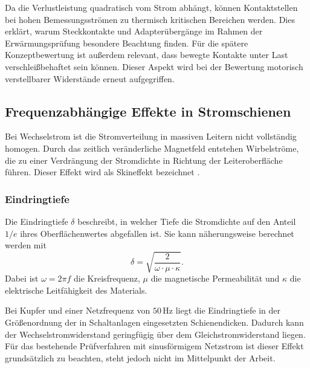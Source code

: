 Da die Verlustleistung quadratisch vom Strom abhängt, können Kontaktstellen bei hohen Bemessungsströmen zu thermisch kritischen Bereichen werden. Dies erklärt, warum Steckkontakte und Adapterübergänge im Rahmen der Erwärmungsprüfung besondere Beachtung finden. Für die spätere Konzeptbewertung ist außerdem relevant, dass bewegte Kontakte unter Last verschleißbehaftet sein können. Dieser Aspekt wird bei der Bewertung motorisch verstellbarer Widerstände erneut aufgegriffen.

\subsection{Frequenzabhängige Effekte in Stromschienen}
\label{sec:frequenzabhaengige_effekte}

Bei Wechselstrom ist die Stromverteilung in massiven Leitern nicht vollständig homogen. Durch das zeitlich veränderliche Magnetfeld entstehen Wirbelströme, die zu einer Verdrängung der Stromdichte in Richtung der Leiteroberfläche führen. Dieser Effekt wird als Skineffekt bezeichnet \cite{Kuepfmueller_TET}.

\subsubsection{Eindringtiefe}
\label{sec:eindringtiefe}

Die Eindringtiefe $\delta$ beschreibt, in welcher Tiefe die Stromdichte auf den Anteil $1/e$ ihres Oberflächenwertes abgefallen ist. Sie kann näherungsweise berechnet werden mit
\begin{equation}
    \delta = \sqrt{\frac{2}{\omega \cdot \mu \cdot \kappa}} .
    \label{eq:eindringtiefe}
\end{equation}
Dabei ist $\omega = 2 \pi f$ die Kreisfrequenz, $\mu$ die magnetische Permeabilität und $\kappa$ die elektrische Leitfähigkeit des Materials.

Bei Kupfer und einer Netzfrequenz von $50\,\mathrm{Hz}$ liegt die Eindringtiefe in der Größenordnung der in Schaltanlagen eingesetzten Schienendicken. Dadurch kann der Wechselstromwiderstand geringfügig über dem Gleichstromwiderstand liegen. Für das bestehende Prüfverfahren mit sinusförmigem Netzstrom ist dieser Effekt grundsätzlich zu beachten, steht jedoch nicht im Mittelpunkt der Arbeit.

